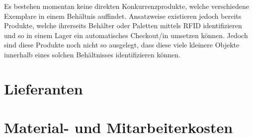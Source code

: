Es bestehen momentan keine direkten Konkurrenzprodukte, welche verschiedene Exemplare in einem Behältnis auffindet. Ansatzweise existieren jedoch bereits Produkte, welche ihrerseits Behälter oder Paletten mittels RFID identifizieren und so in einem Lager ein automatisches Checkout/in umsetzen können. Jedoch sind diese Produkte noch nicht so ausgelegt, dass diese viele kleinere Objekte innerhalb eines solchen Behältnisses identifizieren können.

\section{Lieferanten}

\section{Material- und Mitarbeiterkosten}

